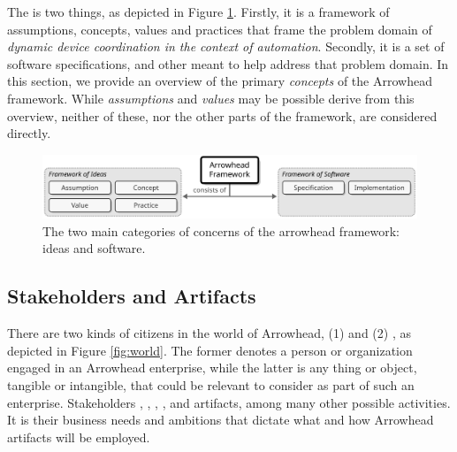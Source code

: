 %
%

The  is two things, as depicted in Figure \ref{fig:framework}.
Firstly, it is a framework of assumptions, concepts, values and practices that frame the problem domain of \textit{dynamic device coordination in the context of automation}.
Secondly, it is a set of software specifications,  and other  meant to help address that problem domain.
In this section, we provide an overview of the primary \textit{concepts} of the Arrowhead framework.
While \textit{assumptions} and \textit{values} may be possible derive from this overview, neither of these, nor the other parts of the framework, are considered directly.

\begin{figure}[ht!]
  \centering
  \includegraphics[scale=0.9]{figures/framework}
  \caption{
    The two main categories of concerns of the arrowhead framework: ideas and software.
  }
  \label{fig:framework}
\end{figure}

\subsection{Stakeholders and Artifacts}

There are two kinds of citizens in the world of Arrowhead, (1)  and (2) , as depicted in Figure \ref{fig:world}.
The former denotes a person or organization engaged in an Arrowhead enterprise, while the latter is any thing or object, tangible or intangible, that could be relevant to consider as part of such an enterprise.
Stakeholders , , , , and  artifacts, among many other possible activities.
It is their business needs and ambitions that dictate what and how Arrowhead artifacts will be employed.

